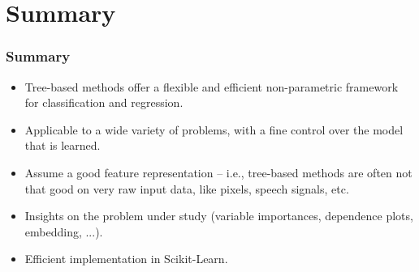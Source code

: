 \documentclass{beamer}
\begin{document}

\section{Summary}

\begin{frame}
  \frametitle{Summary}

  \begin{itemize}
        \item Tree-based methods offer a {\color{blue}flexible and efficient non-parametric} framework
              for classification and regression.

        \vspace{0.25cm}

        \item Applicable to a wide variety of problems, with a {\color{blue}fine control}
              over the model that is learned.

        \vspace{0.25cm}

        \item Assume a good feature representation -- i.e., tree-based methods are often {\color{red}not that good on very
              raw input data}, like pixels, speech signals, etc.

        \vspace{0.25cm}

        \item {\color{blue}Insights on the problem} under study (variable importances,
              dependence plots, embedding, ...).

        \vspace{0.25cm}

        \item {\color{blue}Efficient implementation} in Scikit-Learn.
  \end{itemize}
\end{frame}
\end{document}
